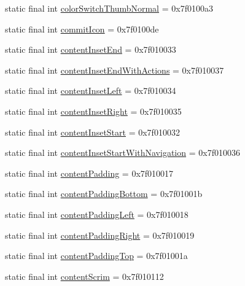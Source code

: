 \begin{CompactItemize}
\item 
static final int \hyperlink{classandroid_1_1support_1_1transition_1_1_r_1_1attr_436913ad7c5d6c1a04cdfabe76583940}{colorSwitchThumbNormal} = 0x7f0100a3
\item 
static final int \hyperlink{classandroid_1_1support_1_1transition_1_1_r_1_1attr_99e62bdad734b4cac9ffab3a6d854145}{commitIcon} = 0x7f0100de
\item 
static final int \hyperlink{classandroid_1_1support_1_1transition_1_1_r_1_1attr_2ade831c6d8096fa1b5989ad5b467ce0}{contentInsetEnd} = 0x7f010033
\item 
static final int \hyperlink{classandroid_1_1support_1_1transition_1_1_r_1_1attr_d4c882c33f445ea4d084c7010a03e604}{contentInsetEndWithActions} = 0x7f010037
\item 
static final int \hyperlink{classandroid_1_1support_1_1transition_1_1_r_1_1attr_5abb710c1a82df6c9c172201d6c8a80f}{contentInsetLeft} = 0x7f010034
\item 
static final int \hyperlink{classandroid_1_1support_1_1transition_1_1_r_1_1attr_3b4af189835d4fc21de3fd1dede94296}{contentInsetRight} = 0x7f010035
\item 
static final int \hyperlink{classandroid_1_1support_1_1transition_1_1_r_1_1attr_5ddab5f82018f6dd36248f0e29049647}{contentInsetStart} = 0x7f010032
\item 
static final int \hyperlink{classandroid_1_1support_1_1transition_1_1_r_1_1attr_bb54325dce4a30bc220659bbd0266834}{contentInsetStartWithNavigation} = 0x7f010036
\item 
static final int \hyperlink{classandroid_1_1support_1_1transition_1_1_r_1_1attr_f360c6caccebecb4eca6c30842ac1798}{contentPadding} = 0x7f010017
\item 
static final int \hyperlink{classandroid_1_1support_1_1transition_1_1_r_1_1attr_722cfb6f8e6af75a222e245695d4af21}{contentPaddingBottom} = 0x7f01001b
\item 
static final int \hyperlink{classandroid_1_1support_1_1transition_1_1_r_1_1attr_585eb6f7dc4355ec31c8da8b942f99c0}{contentPaddingLeft} = 0x7f010018
\item 
static final int \hyperlink{classandroid_1_1support_1_1transition_1_1_r_1_1attr_a059552fec76beb848eb80239e05d29e}{contentPaddingRight} = 0x7f010019
\item 
static final int \hyperlink{classandroid_1_1support_1_1transition_1_1_r_1_1attr_36ff67a7e5c45116443239b21aae6794}{contentPaddingTop} = 0x7f01001a
\item 
static final int \hyperlink{classandroid_1_1support_1_1transition_1_1_r_1_1attr_0a4b8de21e64510fa5e602901ac3298d}{contentScrim} = 0x7f010112

\end{CompactItemize}

